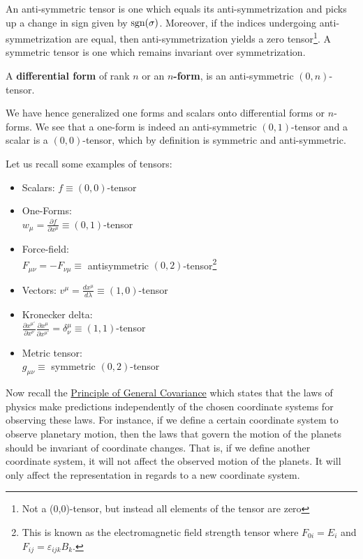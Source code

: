 \documentclass{article}
\begin{document}
 			\begin{lem}
 				An anti-symmetric tensor is one which equals its anti-symmetrization and picks up a change in sign given by $\text{sgn}(\sigma)$. Moreover, if the indices undergoing anti-symmetrization are equal, then anti-symmetrization yields a zero tensor\footnote{Not a (0,0)-tensor, but instead all elements of the tensor are zero}. A symmetric tensor is one which remains invariant over symmetrization.
 			\end{lem}
 			\begin{defn}
 				A \textbf{differential form} of rank $n$ or an \textbf{$n$-form}, is an anti-symmetric $(0,n)$-tensor.
 			\end{defn}
 		\pagebreak
 			We have hence generalized one forms and scalars onto differential forms or $n$-forms. We see that a one-form is indeed an anti-symmetric $(0,1)$-tensor and a scalar is a $(0,0)$-tensor, which by definition is symmetric and anti-symmetric.
 			
 			Let us recall some examples of tensors:
 			\begin{multicols}{2}
 				\begin{itemize}
 					\item Scalars: $f \equiv (0,0)$-tensor
 					\item One-Forms:\\ $w_\mu = \frac{\partial f}{\partial x^\mu}  \equiv (0,1)$-tensor
 					\item Force-field: \\$F_{\mu\nu} = - F_{\nu\mu} \equiv $ antisymmetric $(0,2)$-tensor\footnote{This is known as the electromagnetic field strength tensor where $F_{0i} = E_i$ and $F_{ij} = \varepsilon_{ijk} B_k$.}
 					\item Vectors: $v^\mu = \frac{d x^\mu}{d \lambda} \equiv (1,0)$-tensor
 					\item Kronecker delta: \\
 					$\frac{\partial x^{\mu'}}{\partial x^\nu} \frac{\partial x^\mu}{\partial x^{\mu'}} = \delta^\mu_\nu \equiv (1,1)$-tensor
 					\item Metric tensor:\\
 					$ g_{\mu\nu} \equiv $ symmetric $(0,2)$-tensor
 				\end{itemize}
 			\end{multicols}            
 			Now recall the \hyperref[defn:GeneralCovariance]{Principle of General Covariance} which states that the laws of physics make predictions independently of the chosen coordinate systems for observing these laws. For instance, if we define a certain coordinate system to observe planetary motion, then the laws that govern the motion of the planets should be invariant of coordinate changes. That is, if we define another coordinate system, it will not affect the observed motion of the planets. It will only affect the representation in regards to a new coordinate system.
 			
\end{document}
